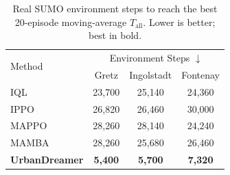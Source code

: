 \begin{table}[t]
  \centering
  \caption{Real SUMO environment steps to reach the best 20-episode moving-average $T_{\mathrm{all}}$. Lower is better; best in bold.}
  \renewcommand{\arraystretch}{1.0}
  \renewcommand{\arraystretch}{1.0}
  \setlength{\tabcolsep}{12pt}
    \begin{tabular}{lccc}
    \toprule
    \multirow{2}{*}{Method} & \multicolumn{3}{c}{Environment Steps $\downarrow$} \\
    & Gretz & Ingolstadt & Fontenay \\
      \midrule
      IQL & 23,700 & 25,140 & 24,360 \\
      IPPO & 26,820 & 26,460 & 30,000 \\
      MAPPO & 28,260 & 28,140 & 24,240 \\
      MAMBA & 28,260 & 25,680 & 26,460 \\
      \textbf{UrbanDreamer} & \textbf{5,400} & \textbf{5,700} & \textbf{7,320} \\
      \bottomrule
    \end{tabular}
  \label{tab:sample-efficiency}
\end{table}
